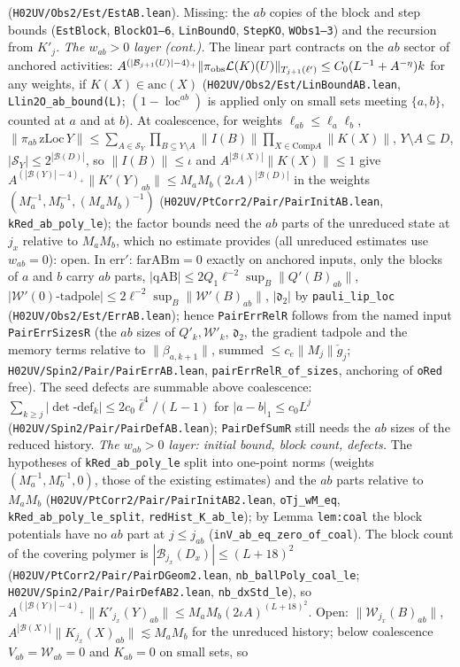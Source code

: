 \documentclass[11pt]{amsart}
\theoremstyle{definition}
\theoremstyle{remark}
\numberwithin{equation}{section}
\begin{document}
(\texttt{H02UV/Obs2/Est/EstAB.lean}). Missing: the $ab$ copies of the block and step bounds (\texttt{EstBlock}, \texttt{BlockO1--6}, \texttt{LinBoundO}, \texttt{StepKO}, \texttt{WObs1--3}) and the recursion from $K'_{j}$. \emph{The $w_{ab}>0$ layer (cont.).} The linear part contracts on the $ab$ sector of anchored activities: $A^{(|\mathcal B_{j+1}(U)|-4)_+}\|\pi_{\rm obs}\mathcal L(K)(U)\|_{T_{j+1}(\ell')}\le C_0(L^{-1}+A^{-\eta})k$ for any weights, if $K(X)\in\mathrm{anc}(X)$ (\texttt{H02UV/Obs2/Est/LinBoundAB.lean}, \texttt{Llin2O\_ab\_bound(L)}; $(1-\operatorname{loc}^{ab})$ is applied only on small sets meeting $\{a,b\}$, counted at $a$ and at $b$). At coalescence, for weights $\ell_{ab}\le\ell_a\ell_b$, $\|\pi_{ab}\,\mathrm{zLoc}\,Y\|\le\sum_{A\in\mathcal S_Y}\prod_{B\subseteq Y\setminus A}\|I(B)\|\prod_{X\in\mathrm{Comp}A}\|K(X)\|$, $Y\setminus A\subseteq D$, $|\mathcal S_Y|\le2^{|\mathcal B(D)|}$, so $\|I(B)\|\le\iota$ and $A^{|\mathcal B(X)|}\|K(X)\|\le1$ give $A^{(|\mathcal B(Y)|-4)_+}\|K'(Y)_{ab}\|\le M_aM_b(2\iota A)^{|\mathcal B(D)|}$ in the weights $(M_a^{-1},M_b^{-1},(M_aM_b)^{-1})$ (\texttt{H02UV/PtCorr2/Pair/PairInitAB.lean}, \texttt{kRed\_ab\_poly\_le}); the factor bounds need the $ab$ parts of the unreduced state at $j_x$ relative to $M_aM_b$, which no estimate provides (all unreduced estimates use $w_{ab}=0$): open. In $\mathrm{err}'$: $\mathrm{farABm}=0$ exactly on anchored inputs, only the blocks of $a$ and $b$ carry $ab$ parts, $|\mathrm{qAB}|\le2Q_1\ell^{-2}\sup_B\|Q'(B)_{ab}\|$, $|\mathcal W'(0)\text{-tadpole}|\le2\ell^{-2}\sup_B\|\mathcal W'(B)_{ab}\|$, $|\mathfrak d_2|$ by \texttt{pauli\_lip\_loc} (\texttt{H02UV/Obs2/Est/ErrAB.lean}); hence \texttt{PairErrRelR} follows from the named input \texttt{PairErrSizesR} (the $ab$ sizes of $Q'_k,\mathcal W'_k$, $\mathfrak d_2$, the gradient tadpole and the memory terms relative to $\|\beta_{a,k+1}\|$, summed $\le c_e\|M_j\|\check g_j$; \texttt{H02UV/Spin2/Pair/PairErrAB.lean}, \texttt{pairErrRelR\_of\_sizes}, anchoring of \texttt{oRed} free). The seed defects are summable above coalescence: $\sum_{k\ge j}|\det\text{-}\mathrm{def}_k|\le2c_0\bar\ell^4/(L-1)$ for $|a-b|_1\le c_0L^{j}$ (\texttt{H02UV/Spin2/Pair/PairDefAB.lean}); \texttt{PairDefSumR} still needs the $ab$ sizes of the reduced history. \emph{The $w_{ab}>0$ layer: initial bound, block count, defects.} The hypotheses of \texttt{kRed\_ab\_poly\_le} split into one-point norms (weights $(M_a^{-1},M_b^{-1},0)$, those of the existing estimates) and the $ab$ parts relative to $M_aM_b$ (\texttt{H02UV/PtCorr2/Pair/PairInitAB2.lean}, \texttt{oTj\_wM\_eq}, \texttt{kRed\_ab\_poly\_le\_split}, \texttt{redHist\_K\_ab\_le}); by Lemma \texttt{lem:coal} the block potentials have no $ab$ part at $j\le j_{ab}$ (\texttt{inV\_ab\_eq\_zero\_of\_coal}). The block count of the covering polymer is $|\mathcal B_{j_x}(D_x)|\le(L+18)^2$ (\texttt{H02UV/PtCorr2/Pair/PairDGeom2.lean}, \texttt{nb\_ballPoly\_coal\_le}; \texttt{H02UV/Spin2/Pair/PairDefAB2.lean}, \texttt{nb\_dxStd\_le}), so $A^{(|\mathcal B(Y)|-4)_+}\|K'_{j_x}(Y)_{ab}\|\le M_aM_b(2\iota A)^{(L+18)^2}$. Open: $\|\mathcal W_{j_x}(B)_{ab}\|$, $A^{|\mathcal B(X)|}\|K_{j_x}(X)_{ab}\|\lesssim M_aM_b$ for the unreduced history; below coalescence $V_{ab}=\mathcal W_{ab}=0$ and $K_{ab}=0$ on small sets, so 
\end{document}
